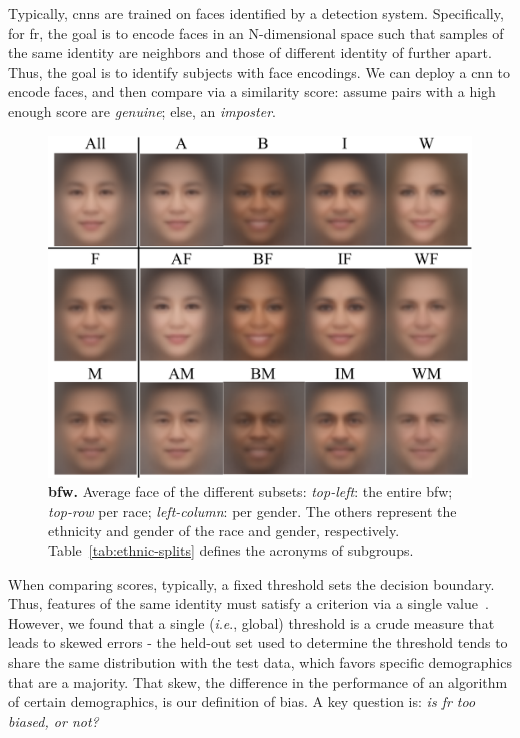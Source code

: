 \documentclass[10pt,twocolumn,letterpaper]{article}
\newcommand{\ie}{\textit{i}.\textit{e}., }
\begin{document}
    Typically, \glspl{cnn} are trained on faces identified by a detection system. Specifically, for \gls{fr}, the goal is to encode faces in an N-dimensional space such that samples of the same identity are neighbors and those of different identity of further apart. Thus, the goal is to identify subjects with face encodings. We can deploy a \gls{cnn} to encode faces, and then compare via a similarity score: assume pairs with a high enough score are \emph{genuine}; else, an \emph{imposter}. 

    \begin{figure}[t!]
        \centering
        \includegraphics[width=.8\linewidth]{figures/montage.pdf}
        \caption{\small{\textbf{\gls{bfw}.} Average face of the different subsets: \emph{top-left}: the entire \gls{bfw}; \emph{top-row} per race;  \emph{left-column}: per gender. The others represent the ethnicity and gender of the race and gender, respectively. Table~\ref{tab:ethnic-splits} defines the acronyms of subgroups.}}
        \label{fig:avg-faces}
    \end{figure}
    
    When comparing scores, typically, a fixed threshold sets the decision boundary. Thus, features of the same identity must satisfy a criterion via a single value~\cite{deng2019arcface, liu2017sphereface, wang2018additive, wang2018cosface}. However, we found that a single (\ie global) threshold is a crude measure that leads to skewed errors - the held-out set used to determine the threshold tends to share the same distribution with the test data, which favors specific demographics that are a majority. That skew, the difference in the performance of an algorithm of certain demographics, is our definition of bias. A key question is: \emph{is \gls{fr} too biased, or not?} 
    
\end{document}

